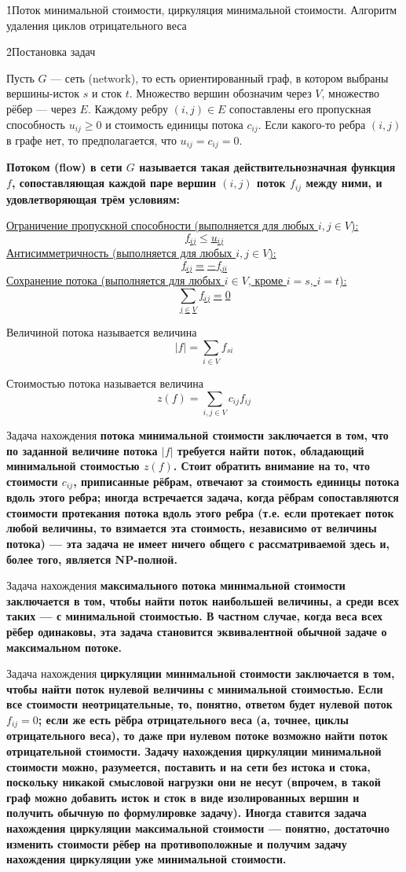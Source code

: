 \h1{Поток минимальной стоимости, циркуляция минимальной стоимости. Алгоритм удаления циклов отрицательного веса}

\h2{Постановка задач}

Пусть $G$ --- сеть (network), то есть ориентированный граф, в котором выбраны вершины-исток $s$ и сток $t$. Множество вершин обозначим через $V$, множество рёбер --- через $E$. Каждому ребру $(i,j) \in E$ сопоставлены его пропускная способность $u_{ij} \ge 0$ и стоимость единицы потока $c_{ij}$. Если какого-то ребра $(i,j)$ в графе нет, то предполагается, что $u_{ij} = c_{ij} = 0$.

\bf{Потоком} (flow) в сети $G$ называется такая действительнозначная функция $f$, сопоставляющая каждой паре вершин $(i,j)$ поток $f_{ij}$ между ними, и удовлетворяющая трём условиям:

\ul{
\li Ограничение пропускной способности (выполняется для любых $i, j \in V$):
$$ f_{ij} \le u_{ij} $$
\li Антисимметричность (выполняется для любых $i, j \in V$):
$$ f_{ij} = - f_{ji} $$
\li Сохранение потока (выполняется для любых $i \in V$, кроме $i=s$, $i=t$):
$$ \sum_{j \in V} f_{ij} = 0 $$
}

Величиной потока называется величина
$$ |f| = \sum_{i \in V} f_{si} $$

Стоимостью потока называется величина
$$ z(f) = \sum_{i,j \in V} c_{ij} f_{ij} $$

Задача нахождения \bf{потока минимальной стоимости} заключается в том, что по заданной величине потока $|f|$ требуется найти поток, обладающий минимальной стоимостью $z(f)$. Стоит обратить внимание на то, что стоимости $c_{ij}$, приписанные рёбрам, отвечают за стоимость единицы потока вдоль этого ребра; иногда встречается задача, когда рёбрам сопоставляются стоимости протекания потока вдоль этого ребра (т.е. если протекает поток любой величины, то взимается эта стоимость, независимо от величины потока) --- эта задача не имеет ничего общего с рассматриваемой здесь и, более того, является NP-полной.

Задача нахождения \bf{максимального потока минимальной стоимости} заключается в том, чтобы найти поток наибольшей величины, а среди всех таких --- с минимальной стоимостью. В частном случае, когда веса всех рёбер одинаковы, эта задача становится эквивалентной обычной задаче о максимальном потоке.

Задача нахождения \bf{циркуляции минимальной стоимости} заключается в том, чтобы найти поток нулевой величины с минимальной стоимостью. Если все стоимости неотрицательные, то, понятно, ответом будет нулевой поток $f_{ij}=0$; если же есть рёбра отрицательного веса (а, точнее, циклы отрицательного веса), то даже при нулевом потоке возможно найти поток отрицательной стоимости. Задачу нахождения циркуляции минимальной стоимости можно, разумеется, поставить и на сети без истока и стока, поскольку никакой смысловой нагрузки они не несут (впрочем, в такой граф можно добавить исток и сток в виде изолированных вершин и получить обычную по формулировке задачу). Иногда ставится задача нахождения циркуляции максимальной стоимости --- понятно, достаточно изменить стоимости рёбер на противоположные и получим задачу нахождения циркуляции уже минимальной стоимости.

